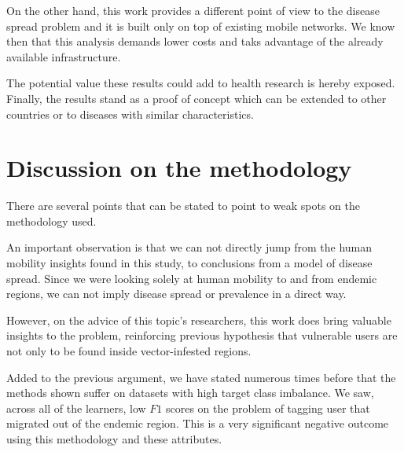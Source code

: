 On the other hand, this work provides a different point of view to the disease spread problem and it is built only on top of existing mobile networks.
We know then that this analysis demands lower costs and taks advantage of the already available infrastructure.

The potential value these results could add to health research is hereby exposed.
Finally, the results stand as a proof of concept which can be extended to other countries or to diseases with similar characteristics.







\section{Discussion on the methodology}

There are several points that can be stated to point to weak spots on the methodology used.

An important observation is that we can not directly jump from the human mobility insights found in this study, to conclusions from a model of disease spread.
Since we were looking solely at human mobility to and from endemic regions, we can not imply disease spread or prevalence in a direct way.

However, on the advice of this topic's researchers, this work does bring valuable insights to the problem, reinforcing previous hypothesis that vulnerable users are not only to be found inside vector-infested regions.


Added to the previous argument, we have stated numerous times before that the methods shown suffer on datasets with high target class imbalance.
We saw, across all of the learners, low $F1$ scores on the problem of tagging user that migrated out of the endemic region. This is a very significant negative outcome using this methodology and these attributes.

